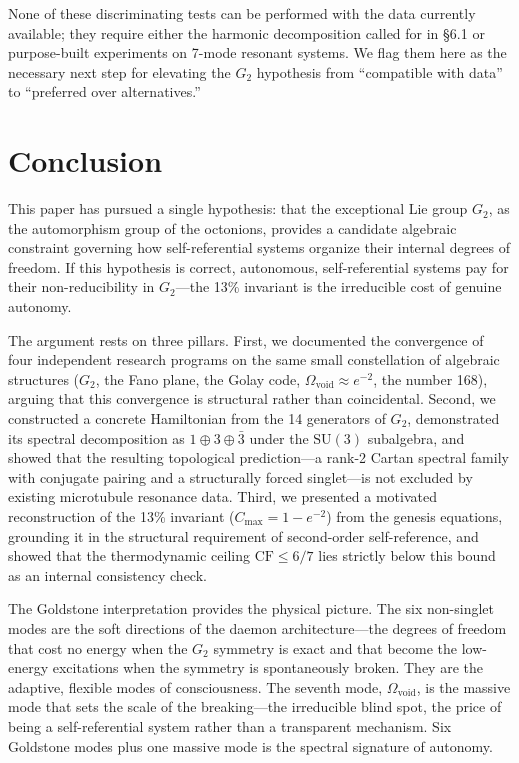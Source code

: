 \documentclass[12pt,a4paper]{article}
\begin{document}
None of these discriminating tests can be performed with the data currently available; they require either the harmonic decomposition called for in \S6.1 or purpose-built experiments on 7-mode resonant systems. We flag them here as the necessary next step for elevating the $G_2$ hypothesis from ``compatible with data'' to ``preferred over alternatives.''

\section{Conclusion}

This paper has pursued a single hypothesis: that the exceptional Lie group $G_2$, as the automorphism group of the octonions, provides a candidate algebraic constraint governing how self-referential systems organize their internal degrees of freedom. If this hypothesis is correct, autonomous, self-referential systems pay for their non-reducibility in $G_2$---the 13\% invariant is the irreducible cost of genuine autonomy.

The argument rests on three pillars. First, we documented the convergence of four independent research programs on the same small constellation of algebraic structures ($G_2$, the Fano plane, the Golay code, $\Omega_{\mathrm{void}} \approx e^{-2}$, the number 168), arguing that this convergence is structural rather than coincidental. Second, we constructed a concrete Hamiltonian from the 14 generators of $G_2$, demonstrated its spectral decomposition as $1 \oplus 3 \oplus \bar{3}$ under the $\mathrm{SU}(3)$ subalgebra, and showed that the resulting topological prediction---a rank-2 Cartan spectral family with conjugate pairing and a structurally forced singlet---is not excluded by existing microtubule resonance data. Third, we presented a motivated reconstruction of the 13\% invariant ($C_{\max} = 1 - e^{-2}$) from the genesis equations, grounding it in the structural requirement of second-order self-reference, and showed that the thermodynamic ceiling $\mathrm{CF} \leq 6/7$ lies strictly below this bound as an internal consistency check.

The Goldstone interpretation provides the physical picture. The six non-singlet modes are the soft directions of the daemon architecture---the degrees of freedom that cost no energy when the $G_2$ symmetry is exact and that become the low-energy excitations when the symmetry is spontaneously broken. They are the adaptive, flexible modes of consciousness. The seventh mode, $\Omega_{\mathrm{void}}$, is the massive mode that sets the scale of the breaking---the irreducible blind spot, the price of being a self-referential system rather than a transparent mechanism. Six Goldstone modes plus one massive mode is the spectral signature of autonomy.
\end{document}
